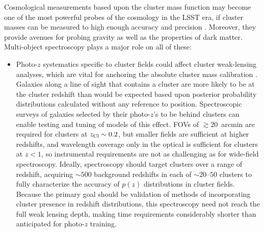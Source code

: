 Cosmological measurements based upon the cluster mass function may become one of the most powerful probes of the cosmology in the LSST era, if cluster masses can be measured to high enough accuracy and precision \citep{visions,Krause}.  Moreover, they provide avenues for probing gravity as well as the properties of dark matter.  Multi-object spectroscopy plays a major role on all of these:

\begin{itemize}
\item Photo-$z$ systematics specific to cluster fields could affect cluster weak-lensing analyses, which are vital for anchoring the absolute cluster mass calibration \citep{Applegate}.  Galaxies along a line of sight that contains a cluster are more likely to be at the cluster redshift than would be expected based upon posterior probability distributions calculated without any reference to position.  %
Spectroscopic surveys of galaxies selected by their photo-$z$'s to be behind clusters can enable testing and tuning of models of this effect.  FOVs of $\gtrsim 20$~arcmin are required for clusters at $z_{\rm Cl}\sim 0.2$, but smaller fields are sufficient at higher redshifts, and wavelength coverage only in the optical is sufficient for clusters at $z<1$, so instrumental requirements are not as challenging as for wide-field spectroscopy.  
Ideally, spectroscopy should target clusters over a range of redshift, acquiring $\sim 500$ background redshifts in each of  $\sim 20$--$50$ clusters to fully characterize the accuracy of $p(z)$ distributions in cluster fields.  Because the primary goal should be validation of methods of incorporating cluster presence in redshift distributions, this spectroscopy need not reach the full weak lensing depth, making time requirements considerably shorter than anticipated for photo-$z$ training.


\end{itemize}
